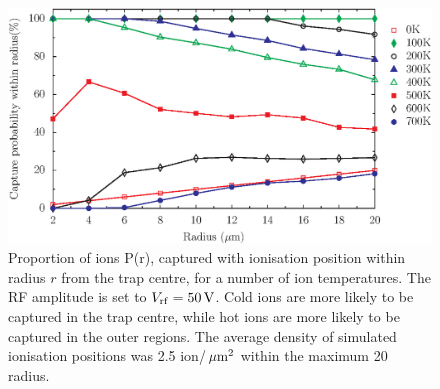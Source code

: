  \begin{figure}[h!t]
 \centering
 \includegraphics[width=13.5cm]{chapter3/tempcapture/capture_prob_50_v2}
 \caption[Capture probability as function of ionization position]{
Proportion of ions P(r), captured with ionisation position within radius $r$ from the trap centre, for a number of ion temperatures. The RF amplitude is set to $V_{\rm rf} = 50\,\mbox{V}$.  Cold ions are more likely to be captured in the trap centre, while hot ions are more likely to be captured in the outer regions. The average density of simulated ionisation positions was 2.5 ion/$\,\mbox{$\mu$m}^2$ within the maximum 20\um\, radius.
}
 \label{fig:captureprobtemp}
 \end{figure} 


